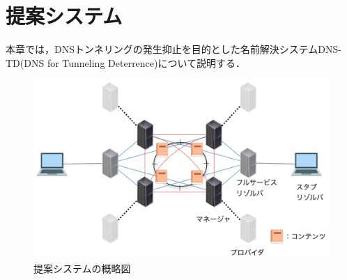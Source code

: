 \section{提案システム}
本章では，DNSトンネリングの発生抑止を目的とした名前解決システムDNS-TD(DNS for Tunneling Deterrence)について説明する．
\begin{figure}[h]
 \centering
 \label{fig:abstruct-DNS-TD-architecture}
 \includegraphics[scale=0.6]{figure/new-architecture-DNS-TD.png}
 \caption{提案システムの概略図}
\end{figure}

